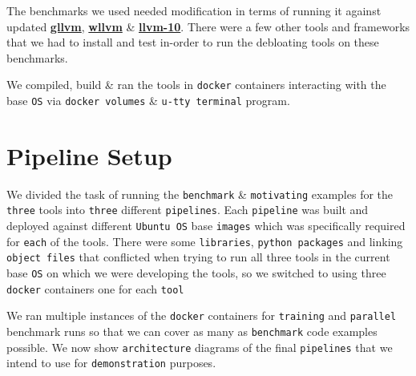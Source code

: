 \documentclass{relatorio}
\begin{document}
The benchmarks we used needed modification in terms of running it against updated \textbf{\href{https://github.com/SRI-CSL/gllvm}{gllvm}}, \textbf{\href{https://github.com/SRI-CSL/whole-program-llvm}{wllvm}} \& \textbf{\href{https://github.com/lahiri-phdworks/llvm-project/tree/release/10.x}{llvm-10}}. There were a few other tools and frameworks that we had to install and test in-order to run the debloating tools on these benchmarks. 

We compiled, build \& ran the tools in \texttt{docker} containers interacting with the base \texttt{OS} via \texttt{docker volumes} \& \texttt{u-tty terminal} program.

\section{Pipeline Setup}%
\label{Tools}

We divided the task of running the \texttt{benchmark} \& \texttt{motivating} examples for the \texttt{three} tools into \texttt{three} different \texttt{pipelines}. Each \texttt{pipeline} was built and deployed against different \texttt{Ubuntu OS} base \texttt{images} which was specifically required for \texttt{each} of the tools. There were some \texttt{libraries}, \texttt{python packages} and linking \texttt{object files} that conflicted when trying to run all three tools in the current base \texttt{OS} on which we were developing the tools, so we switched to using three \texttt{docker} containers one for each \texttt{tool} 

We ran multiple instances of the \texttt{docker} containers for \texttt{training} and \texttt{parallel} benchmark runs so that we can cover as many as \texttt{benchmark} code examples possible. We now show \texttt{architecture} diagrams of the final \texttt{pipelines} that we intend to use for \texttt{demonstration} purposes. 
\end{document}
